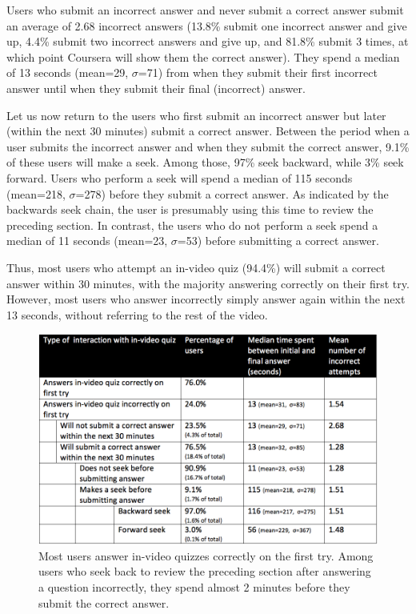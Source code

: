 \documentclass{sigchi}
\begin{document}
Users who submit an incorrect answer and never submit a correct answer submit an average of 2.68 incorrect answers (13.8\% submit one incorrect answer and give up, 4.4\% submit two incorrect answers and give up, and 81.8\% submit 3 times, at which point Coursera will show them the correct answer). They spend a median of 13 seconds (mean=29, $\sigma$=71) from when they submit their first incorrect answer until when they submit their final (incorrect) answer.

Let us now return to the users who first submit an incorrect answer but later (within the next 30 minutes) submit a correct answer. Between the period when a user submits the incorrect answer and when they submit the correct answer, 9.1\% of these users will make a seek. Among those, 97\% seek backward, while 3\% seek forward. Users who perform a seek will spend a median of 115 seconds (mean=218, $\sigma$=278) before they submit a correct answer. As indicated by the backwards seek chain, the user is presumably using this time to review the preceding section. In contrast, the users who do not perform a seek spend a median of 11 seconds (mean=23, $\sigma$=53) before submitting a correct answer.

Thus, most users who attempt an in-video quiz (94.4\%) will submit a correct answer within 30 minutes, with the majority answering correctly on their first try.  However, most users who answer incorrectly simply answer again within the next 13 seconds, without referring to the rest of the video. %

\begin{figure}
\includegraphics[width=1.0\columnwidth]{time-spent-on-quizzes}
\caption{Most users answer in-video quizzes correctly on the first try. Among users who seek back to review the preceding section after answering a question incorrectly, they spend almost 2 minutes before they submit the correct answer.}
\label{fig:time-spent-on-quizzes}
\end{figure}
\end{document}
